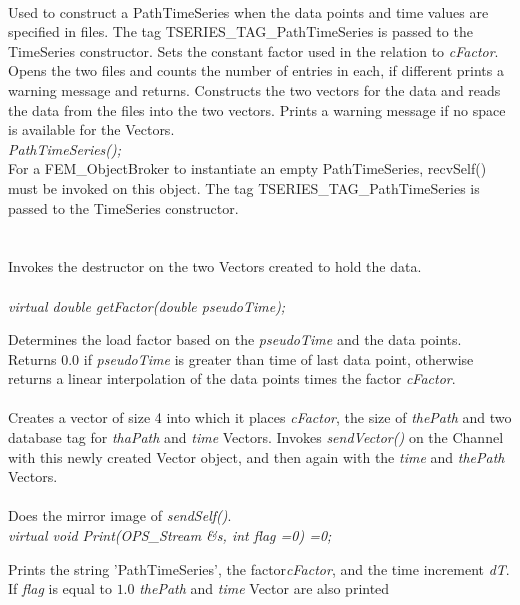 \\  
Used to construct a PathTimeSeries when the data points and time
values are specified in files. The tag TSERIES\_TAG\_PathTimeSeries is
passed to the TimeSeries constructor. Sets the constant factor used in
the relation to {\em cFactor}. Opens the two files and counts the
number of entries in each, if different prints a warning message and
returns. Constructs the two vectors for the data and reads the data
from the files into the two vectors. Prints a warning message if no
space is available for the Vectors.\\

{\em PathTimeSeries();}\\ 

For a FEM\_ObjectBroker to instantiate an empty PathTimeSeries, recvSelf()
must be invoked on this object. The tag TSERIES\_TAG\_PathTimeSeries is
passed to the TimeSeries constructor. \\


 \\
\\ 
Invokes the destructor on the two Vectors created to hold the data. \\

 \\
{\em  virtual double getFactor(double pseudoTime);}

Determines the load factor based on the {\em pseudoTime} and the data
points. Returns $0.0$ if {\em pseudoTime} is greater than time of last
data point, otherwise returns a linear interpolation of the data
points times the factor {\em cFactor}. \\

\\
Creates a vector of size 4 into which it places {\em cFactor}, the
size of {\em thePath} and two  database tag for {\em 
thaPath} and {\em time} Vectors.  Invokes {\em sendVector()} on the
Channel with this newly created Vector object, and then again with the
{\em time} and {\em thePath} Vectors.\\

\\
Does the mirror image of {\em sendSelf()}. \\

{\em  virtual void Print(OPS_Stream \&s, int flag =0) =0;}

Prints the string 'PathTimeSeries', the factor{\em cFactor}, and the time
increment {\em dT}. If {\em flag} is equal to $1.0$ {\em
thePath} and {\em time} Vector are also printed\\